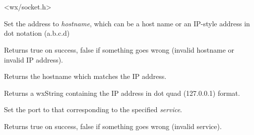 \section{}\label{wxipv4address}




<wx/socket.h>


%
%



Set the address to {\it hostname}, which can be a host name
or an IP-style address in dot notation (a.b.c.d)


Returns true on success, false if something goes wrong
(invalid hostname or invalid IP address).

%
%



Returns the hostname which matches the IP address.

%
%



Returns a wxString containing the IP address in dot quad (127.0.0.1) format.

%
%



Set the port to that corresponding to the specified {\it service}.


Returns true on success, false if something goes wrong
(invalid service).

